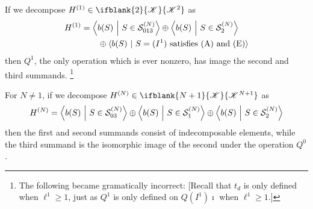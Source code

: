 \documentclass[10pt]{article}
\newcommand{\LL}[1]{\ifblank{#1}{\scrK}{\scrK^{#1}}}
\renewcommand{\Q}{Q}
\begin{document}
\begin{CalculatingRepeatedKoszul}
\begin{thm}\label{longDescriptionOfHN}
If we decompose $H^{(1)}\in\LL{2}$ as
\begin{alignat*}{2}
H^{(1)}
&=
\left\langle b(S)\ \middle|\ S\in\calS_{013}^{(N)}\right\rangle\oplus\left\langle b(S)\ \middle|\ S\in\calS_{2}^{(N)}\right\rangle
\\
&
\quad\quad  \oplus\langle b(S)\ |\ S=(I^1)\textup{ satisfies (A) and (E)}\rangle%
\end{alignat*}
then $\Q^1$, the only operation which is ever nonzero, has image the second and third summands.%
\footnote{The following became gramatically incorrect: [Recall that $t_d$ is only defined when $\ell^1\geq1$, just as $Q^1$ is only defined on $Q(I^1)\imath$ when $\ell^1\geq1$.]}

For $N\neq1$, if we decompose $H^{(N)}\in\LL{N+1}$ as
\[H^{(N)}=
\left\langle b(S)\ \middle|\ S\in\mathcal{S}_{03}^{(N)}\right\rangle\oplus
\left\langle b(S)\ \middle|\ S\in\mathcal{S}_1^{(N)}\right\rangle \oplus \left\langle b(S)\ \middle|\ S\in\mathcal{S}_2^{(N)}\right\rangle\]
then the first and second summands consist of indecomposable elements, while the third summand is the isomorphic image of the second under the operation $\Q^0$.


\end{thm}
\end{CalculatingRepeatedKoszul}
\end{document}
